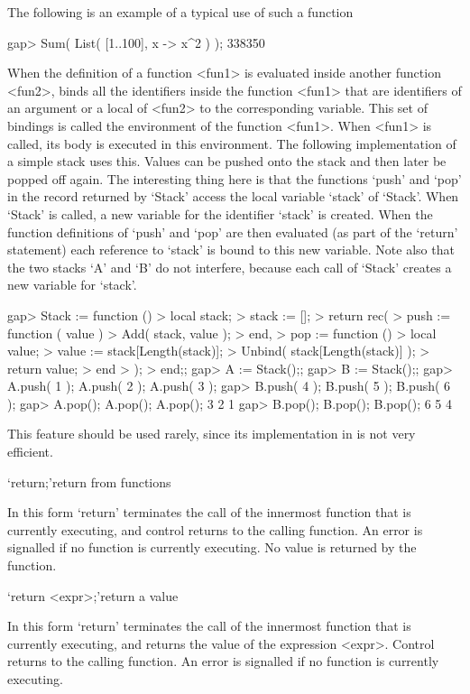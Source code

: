 {The following is an example of a typical use of such a function

\beginexample
gap> Sum( List( [1..100], x -> x^2 ) );
338350
\endexample

When the definition of a function <fun1> is evaluated inside another
function <fun2>,
{\GAP} binds all the identifiers inside the function <fun1> that
are identifiers of an argument or a local of <fun2> to the corresponding
variable. This set of bindings is called the environment of the function
<fun1>. When <fun1> is called, its body is executed in this environment.
The following implementation of a simple stack uses this. Values can be
pushed onto the stack and then later be popped off again.  The
interesting thing here is that the functions `push' and `pop' in the
record returned by `Stack' access the local variable `stack' of `Stack'.
When `Stack' is called, a new variable for the identifier `stack' is
created.  When the function definitions of `push' and `pop' are then
evaluated (as part of the `return' statement) each reference to `stack'
is bound to this new variable. Note also that the two stacks `A' and `B'
do not interfere, because each call of `Stack' creates a new variable for
`stack'.

\beginexample
gap> Stack := function ()
>     local  stack;
>     stack := [];
>     return rec(
>       push := function ( value )
>         Add( stack, value );
>       end,
>       pop := function ()
>         local  value;
>         value := stack[Length(stack)];
>         Unbind( stack[Length(stack)] );
>         return value;
>       end
>     );
>  end;;
gap> A := Stack();;
gap> B := Stack();;
gap> A.push( 1 ); A.push( 2 ); A.push( 3 );
gap> B.push( 4 ); B.push( 5 ); B.push( 6 );
gap> A.pop(); A.pop(); A.pop();
3
2
1
gap> B.pop(); B.pop(); B.pop();
6
5
4
\endexample

This feature should be used rarely, since its implementation in {\GAP} is
not very efficient.


\>`return;'{return from functions}

In this form `return' terminates the call of the innermost function that
is currently executing, and control returns to the calling function. An
error is signalled if no function is currently executing. No value is
returned by the function.

\>`return <expr>;'{return a value}

In this form `return' terminates the call of the innermost function that
is currently executing, and returns the value of the expression <expr>.
Control returns to the calling function. An error is signalled if no
function is currently executing.

}

